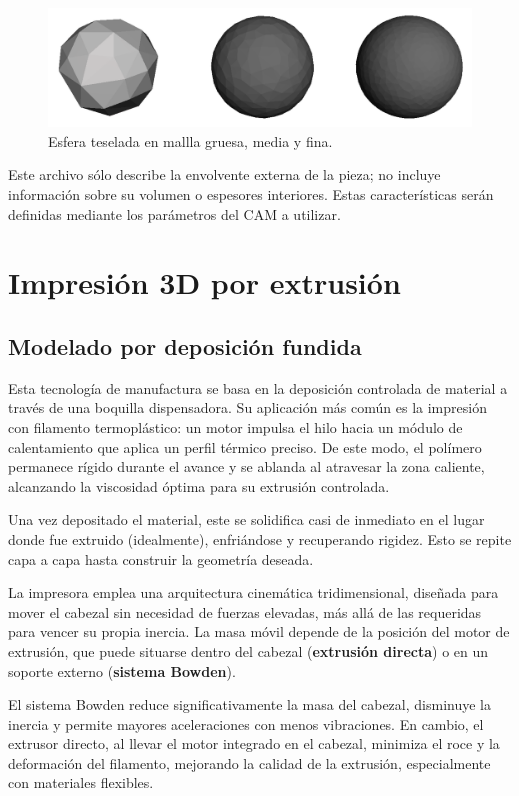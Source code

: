 \begin{figure}[h!]
	\centering
	\includegraphics[width=0.8\linewidth]{imgs/tesel.png}
	\caption{Esfera teselada en mallla gruesa, media y fina.}
	\label{stlfig}
\end{figure} 


Este archivo sólo describe la envolvente externa de la pieza; no incluye información sobre su volumen o espesores interiores. Estas características serán definidas mediante los parámetros del CAM a utilizar.

\section{Impresión 3D por extrusión}

\subsection{Modelado por deposición fundida}

Esta tecnología de manufactura se basa en la deposición controlada de material a través de una boquilla dispensadora. Su aplicación más común es la impresión con filamento termoplástico: un motor impulsa el hilo hacia un módulo de calentamiento que aplica un perfil térmico preciso. De este modo, el polímero permanece rígido durante el avance y se ablanda al atravesar la zona caliente, alcanzando la viscosidad óptima para su extrusión controlada.

Una vez depositado el material, este se solidifica casi de inmediato en el lugar donde fue extruido (idealmente), enfriándose y recuperando rigidez. Esto se repite capa a capa hasta construir la geometría deseada.

La impresora emplea una arquitectura cinemática tridimensional, diseñada para mover el cabezal sin necesidad de fuerzas elevadas, más allá de las requeridas para vencer su propia inercia. La masa móvil depende de la posición del motor de extrusión, que puede situarse dentro del cabezal (\textbf{extrusión directa}) o en un soporte externo (\textbf{sistema Bowden}).

El sistema Bowden reduce significativamente la masa del cabezal, disminuye la inercia y permite mayores aceleraciones con menos vibraciones. En cambio, el extrusor directo, al llevar el motor integrado en el cabezal, minimiza el roce y la deformación del filamento, mejorando la calidad de la extrusión, especialmente con materiales flexibles.

